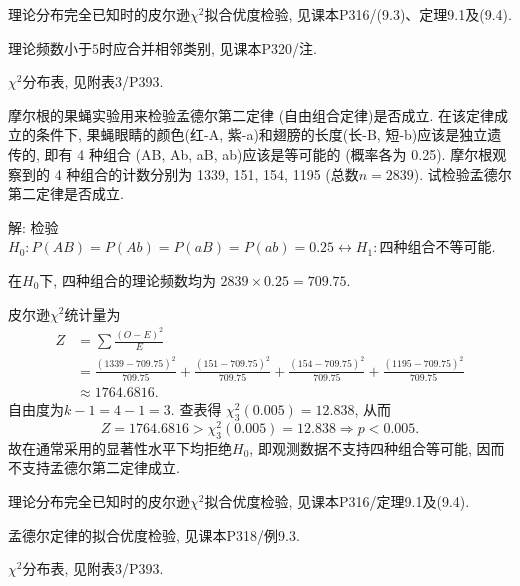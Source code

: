 \documentclass[standard]{ExBook}
\renewenvironment{shaded}{%
  \def\FrameCommand{\fboxsep=\FrameSep \colorbox{shadecolor}}%
  \MakeFramed{\advance\hsize-\width \FrameRestore}%
}{%
  \endMakeFramed
}
\begin{document}
\begin{qitems}
\textcolor{themeColor}{\selectfont {} 理论分布完全已知时的皮尔逊$\chi^2$拟合优度检验, 见课本P316/(9.3)、定理9.1及(9.4).}

\textcolor{themeColor}{\selectfont {} 理论频数小于$5$时应合并相邻类别, 见课本P320/注.}

\textcolor{themeColor}{\selectfont {} $\chi^2$分布表, 见附表3/P393.}

\vspace{2.5cm-5em}

    \begin{bbox}
    \begin{shaded}
        \qitem
摩尔根的果蝇实验用来检验孟德尔第二定律 (自由组合定律)是否成立. 在该定律成立的条件下, 果蝇眼睛的颜色(红-A, 紫-a)和翅膀的长度(长-B, 短-b)应该是独立遗传的, 即有 4 种组合 (AB, Ab, aB, ab)应该是等可能的 (概率各为 0.25). 摩尔根观察到的 4 种组合的计数分别为 1339, 151, 154, 1195 (总数$n=2839$). 试检验孟德尔第二定律是否成立.
    \end{shaded}
    \end{bbox}

\vspace{\dimexpr2.5cm-5em\relax}

解: 检验
$
H_0:P(AB)=P(Ab)=P(aB)=P(ab)=0.25
\leftrightarrow
H_1:\text{四种组合不等可能}
$.

在$H_0$下, 四种组合的理论频数均为
$
2839\times0.25=709.75
$.

皮尔逊$\chi^2$统计量为
$$
\begin{aligned}
Z
&=\sum\frac{(O-E)^2}{E}\\
&=\frac{(1339-709.75)^2}{709.75}
+\frac{(151-709.75)^2}{709.75}
+\frac{(154-709.75)^2}{709.75}
+\frac{(1195-709.75)^2}{709.75}\\
&\approx1764.6816.
\end{aligned}
$$
自由度为$k-1=4-1=3$. 查表得
$
\chi_3^2(0.005)=12.838
$,
从而
$$
Z=1764.6816>\chi_3^2(0.005)=12.838
\Longrightarrow
p<0.005.
$$
故在通常采用的显著性水平下均拒绝$H_0$, 即观测数据不支持四种组合等可能, 因而不支持孟德尔第二定律成立.

\textcolor{themeColor}{\selectfont {} 理论分布完全已知时的皮尔逊$\chi^2$拟合优度检验, 见课本P316/定理9.1及(9.4).}

\textcolor{themeColor}{\selectfont {} 孟德尔定律的拟合优度检验, 见课本P318/例9.3.}

\textcolor{themeColor}{\selectfont {} $\chi^2$分布表, 见附表3/P393.}

\vspace{2.5cm-5em}


\end{qitems}
\end{document}
